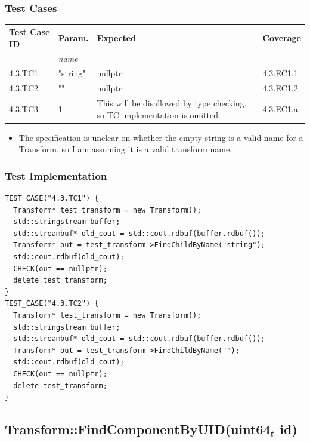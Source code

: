 \documentclass[11pt]{article}
\begin{document}
\subsubsection*{Test Cases}
\label{sec:org1f3b5d7}
\begin{center}
\begin{tabularx}{\textwidth}{lXXX}
\hline
\textbf{Test Case ID} & \textbf{Param.} & \textbf{Expected} & \textbf{Coverage}\\
 & \textit{name} &  & \\
\hline
4.3.TC1 & "string" & nullptr & 4.3.EC1.1\\
\hline
4.3.TC2 & "" & nullptr & 4.3.EC1.2\\
\hline
4.3.TC3 & 1 & This will be disallowed by type checking, so TC implementation is omitted. & 4.3.EC1.a\\
\hline
\end{tabularx}
\end{center}

\begin{itemize}
\item The specification is unclear on whether the empty string is a valid name for a Transform, so I am assuming it is a valid transform name.
\end{itemize}
\subsubsection*{Test Implementation}
\label{sec:orgce093cc}
\begin{verbatim}
TEST_CASE("4.3.TC1") {
  Transform* test_transform = new Transform();
  std::stringstream buffer;
  std::streambuf* old_cout = std::cout.rdbuf(buffer.rdbuf());
  Transform* out = test_transform->FindChildByName("string");
  std::cout.rdbuf(old_cout);
  CHECK(out == nullptr);
  delete test_transform;
}
TEST_CASE("4.3.TC2") {
  Transform* test_transform = new Transform();
  std::stringstream buffer;
  std::streambuf* old_cout = std::cout.rdbuf(buffer.rdbuf());
  Transform* out = test_transform->FindChildByName("");
  std::cout.rdbuf(old_cout);
  CHECK(out == nullptr);
  delete test_transform;
}
\end{verbatim}

\clearpage
\subsection{Transform::FindComponentByUID(uint64\textsubscript{t} id)}
\label{sec:orgf8300e1}
\end{document}
